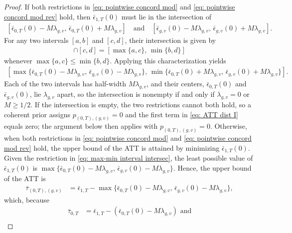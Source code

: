 \documentclass[twoside,11pt]{article}
\begin{document}
\begin{proof}
If both restrictions in \eqref{eq: pointwise concord mod} and \eqref{eq: pointwise concord mod rev} hold, then $\bar{\epsilon}_{1,T}(0)$ must lie in the intersection of
\begin{align*}
\left[\bar{\epsilon}_{0,T}(0) - M \lambda_{g,v}, \, \bar{\epsilon}_{0,T}(0) + M \lambda_{g,v}\right]
\quad \text{and} \quad
\left[\bar{\epsilon}_{g,v}(0) - M \lambda_{g,v}, \, \bar{\epsilon}_{g,v}(0) + M \lambda_{g,v}\right].
\end{align*}
For any two intervals $[a, b]$ and $[c, d]$, their intersection is given by
\begin{align*}
[a, b] \cap [c, d] = [\max\{a, c\},\, \min\{b, d\}]
\end{align*}
whenever $\max\{a,c\} \leq \min\{b,d\}$. Applying this characterization yields
\begin{align} \label{eq: max-min interval intersec}
\left[\max\{\bar{\epsilon}_{0,T}(0) - M \lambda_{g,v}, \, \bar{\epsilon}_{g,v}(0) - M \lambda_{g,v}\}, \,
\min\{\bar{\epsilon}_{0,T}(0) + M \lambda_{g,v}, \, \bar{\epsilon}_{g,v}(0) + M \lambda_{g,v}\}\right].
\end{align}
Each of the two intervals has half-width $M \lambda_{g,v}$, and their centers, $\bar{\epsilon}_{0,T}(0)$ and $\bar{\epsilon}_{g,v}(0)$, lie $\lambda_{g,v}$ apart, so the intersection is nonempty if and only if $\lambda_{g,v} = 0$ or $M \geq 1/2$. If the intersection is empty, the two restrictions cannot both hold, so a coherent prior assigns $p_{(0,T),(g,v)} = 0$ and the first term in \eqref{eq: ATT dist I} equals zero; the argument below then applies with $p_{(0,T),(g,v)} = 0$. Otherwise, when both restrictions in \eqref{eq: pointwise concord mod} and \eqref{eq: pointwise concord mod rev} hold, the upper bound of the \textrm{ATT} is attained by minimizing $\bar{\epsilon}_{1,T}(0)$. Given the restriction in \eqref{eq: max-min interval intersec}, the least possible value of $\bar{\epsilon}_{1,T}(0)$ is $\max\{\bar{\epsilon}_{0,T}(0) - M \lambda_{g,v}, \, \bar{\epsilon}_{g,v}(0) - M \lambda_{g,v}\}$. Hence, the upper bound of the \textrm{ATT} is 
\begin{align*}
\overline{\tau}_{(0,T),(g,v)} & = \bar{\epsilon}_{1,T} - \max\{\bar{\epsilon}_{0,T}(0) - M \lambda_{g,v}, \, \bar{\epsilon}_{g,v}(0) - M \lambda_{g,v}\},
\end{align*}
which, because 
\begin{align*}
\overline{\tau}_{0,T} & = \bar{\epsilon}_{1,T} - \left(\bar{\epsilon}_{0,T}(0) - M \lambda_{g,v}\right) \text{ and} \\

\end{align*}
\end{proof}
\end{document}
